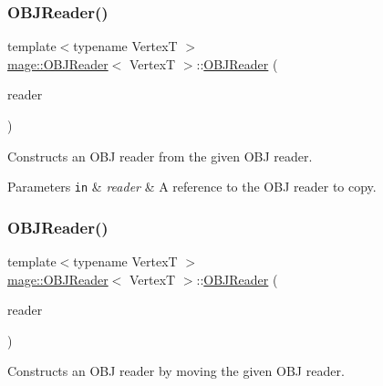 \subsubsection{\texorpdfstring{O\+B\+J\+Reader()}{OBJReader()}\hspace{0.1cm}{\footnotesize\ttfamily [2/3]}}
{\footnotesize\ttfamily template$<$typename VertexT $>$ \\
\hyperlink{classmage_1_1_o_b_j_reader}{mage\+::\+O\+B\+J\+Reader}$<$ VertexT $>$\+::\hyperlink{classmage_1_1_o_b_j_reader}{O\+B\+J\+Reader} (\begin{DoxyParamCaption}\item[{const \hyperlink{classmage_1_1_o_b_j_reader}{O\+B\+J\+Reader}$<$ VertexT $>$ \&}]{reader }\end{DoxyParamCaption})\hspace{0.3cm}{\ttfamily [delete]}}

Constructs an O\+BJ reader from the given O\+BJ reader.


\begin{DoxyParams}[1]{Parameters}
\mbox{\tt in}  & {\em reader} & A reference to the O\+BJ reader to copy. \\
\hline
\end{DoxyParams}
\hypertarget{classmage_1_1_o_b_j_reader_a67b39c51aaeaeb7b7b6f1a6df850000e}{}\label{classmage_1_1_o_b_j_reader_a67b39c51aaeaeb7b7b6f1a6df850000e} 
\subsubsection{\texorpdfstring{O\+B\+J\+Reader()}{OBJReader()}\hspace{0.1cm}{\footnotesize\ttfamily [3/3]}}
{\footnotesize\ttfamily template$<$typename VertexT $>$ \\
\hyperlink{classmage_1_1_o_b_j_reader}{mage\+::\+O\+B\+J\+Reader}$<$ VertexT $>$\+::\hyperlink{classmage_1_1_o_b_j_reader}{O\+B\+J\+Reader} (\begin{DoxyParamCaption}\item[{\hyperlink{classmage_1_1_o_b_j_reader}{O\+B\+J\+Reader}$<$ VertexT $>$ \&\&}]{reader }\end{DoxyParamCaption})\hspace{0.3cm}{\ttfamily [noexcept]}}

Constructs an O\+BJ reader by moving the given O\+BJ reader.



